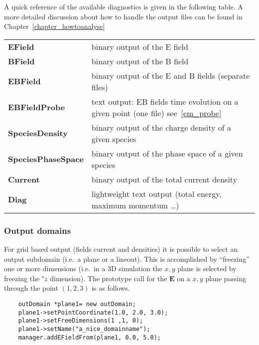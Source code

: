 \documentclass[11pt,a4paper]{report}
\begin{document}
A quick reference of the available diagnostics is given in the following table.
A more detailed discussion about how to handle the output files can be found in Chapter~\ref{chapter_howtoanalyse}
\begin{center}
    \begin{tabular}{ l  l }
    	\textbf{EField}            & binary output of the E field                                                          \\
    	\textbf{BField}            & binary output of the B field                                                          \\
    	\textbf{EBField}           & binary output of the E and B fields (separate files)                                  \\
    	\textbf{EBFieldProbe}      & text output: EB fields time evolution on a given point (one file) see~\ref{em_probe}  \\
    	\textbf{SpeciesDensity}    & binary output of the charge density of a given species                                \\
    	\textbf{SpeciesPhaseSpace} & binary output of the phase space of a given species                                   \\
    	\textbf{Current}           & binary output of the total current density                                            \\
    	\textbf{Diag}              & lightweight text output (total energy, maximum momentum \ldots)
    \end{tabular}
\end{center}

\subsubsection{Output domains}
For grid based output (fields current and densities) it is possible to select an output subdomain (i.e.\ a plane or a lineout). This is accomplished by ``freezing'' one or more dimensions (i.e.\ in a 3D simulation the $x,y$ plane is selected by freezing the "$z$ dimension).
The prototype call for the $\mathbf{E}$ on a  $x,y$ plane passing through the point $(1,2,3)$ is as follows.

\begin{lstlisting}
	outDomain *plane1= new outDomain;
	plane1->setPointCoordinate(1.0, 2.0, 3.0);
	plane1->setFreeDimensions(1 ,1, 0);
	plane1->setName("a_nice_domainname");
	manager.addEFieldFrom(plane1, 0.0, 5.0);
\end{lstlisting}
\end{document}
